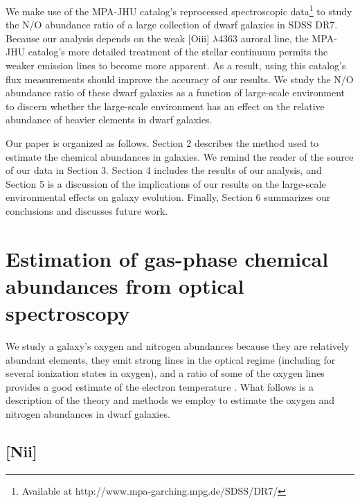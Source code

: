 We make use of the MPA-JHU catalog's reprocessed spectroscopic 
data\footnote{Available at http://www.mpa-garching.mpg.de/SDSS/DR7/} to study 
the N/O abundance ratio of a large collection of dwarf galaxies in SDSS DR7.  
Because our analysis depends on the weak [O{\sc iii}] $\lambda 4363$ auroral 
line, the MPA-JHU catalog's more detailed treatment of the stellar continuum 
permits the weaker emission lines to become more apparent.  As a result, using 
this catalog's flux measurements should improve the accuracy of our results.  We 
study the N/O abundance ratio of these dwarf galaxies as a function of 
large-scale environment to discern whether the large-scale environment has an 
effect on the relative abundance of heavier elements in dwarf galaxies.

Our paper is organized as follows.  Section 2 describes the method used to 
estimate the chemical abundances in galaxies.  We remind the reader of the 
source of our data in Section 3.  Section 4 includes the results of our analysis, 
and Section 5 is a discussion of the implications of our results on the 
large-scale environmental effects on galaxy evolution.  Finally, Section 6 
summarizes our conclusions and discusses future work.


%
%
\section[Theory]{Estimation of gas-phase chemical abundances from optical spectroscopy}
\label{sec:Theory}

We study a galaxy's oxygen and nitrogen abundances because they are relatively 
abundant elements, they emit strong lines in the optical regime (including for 
several ionization states in oxygen), and a ratio of some of the oxygen lines 
provides a good estimate of the electron temperature \citep{Kewley02}.  What 
follows is a description of the theory and methods we employ to estimate the 
oxygen and nitrogen abundances in dwarf galaxies.


\subsection{[N{\sc ii}]}


